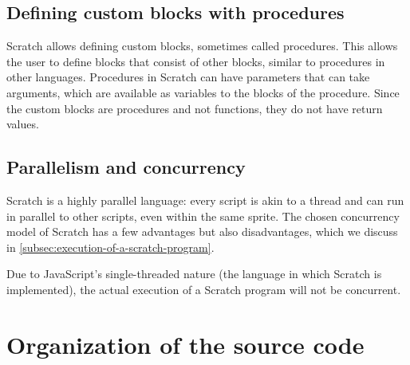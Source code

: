 \documentclass[../main]{subfiles}
\begin{document}
\subsection{Defining custom blocks with procedures}\label{subsec:defining-custom-blocks-with-procedures}

Scratch allows defining custom blocks, sometimes called procedures.
This allows the user to define blocks that consist of other blocks, similar to procedures in other languages.
Procedures in Scratch can have parameters that can take arguments, which are available as variables to the blocks of the procedure.
Since the custom blocks are procedures and not functions, they do not have return values.

\subsection{Parallelism and concurrency}\label{subsec:parallelism}

Scratch is a highly parallel language: every script is akin to a thread and can run in parallel to other scripts, even within the same sprite.
The chosen concurrency model of Scratch has a few advantages but also disadvantages, which we discuss in \cref{subsec:execution-of-a-scratch-program}.

Due to JavaScript's single-threaded nature (the language in which Scratch is implemented), the actual execution of a Scratch program will not be concurrent.

\section{Organization of the source code}\label{sec:scratch-internal}
\end{document}
